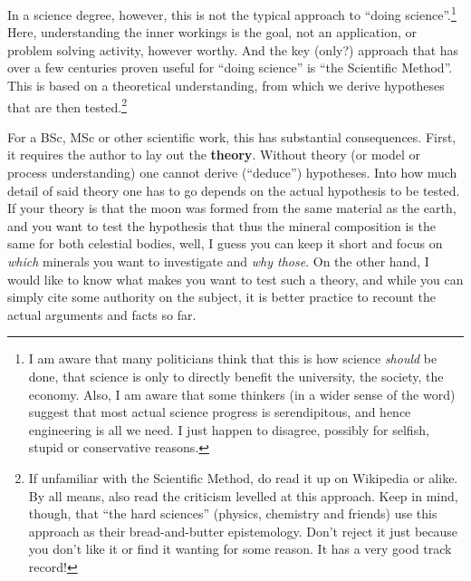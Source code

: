 In a science degree, however, this is not the typical approach to ``doing science''.\footnote{I am aware that many politicians think that this is how science \emph{should} be done, that science is only to directly benefit the university, the society, the economy. Also, I am aware that some thinkers (in a wider sense of the word) suggest that most actual science progress is serendipitous, and hence engineering is all we need. I just happen to disagree, possibly for selfish, stupid or conservative reasons.} 
Here, understanding the inner workings is the goal, not an application, or problem solving activity, however worthy. And the key (only?) approach that has over a few centuries proven useful for ``doing science'' is ``the Scientific Method''. This is based on a theoretical understanding, from which we derive hypotheses that are then tested.\footnote{If unfamiliar with the Scientific Method, do read it up on Wikipedia or alike. By all means, also read the criticism levelled at this approach. Keep in mind, though, that ``the hard sciences'' (physics, chemistry and friends) use this approach as their bread-and-butter epistemology. Don't reject it just because you don't like it or find it wanting for some reason. It has a very good track record!}

For a BSc, MSc or other scientific work, this has substantial consequences. First, it requires the author to lay out the \textbf{theory}. Without theory (or model or process understanding) one cannot derive (``deduce'') hypotheses. Into how much detail of said theory one has to go depends on the actual hypothesis to be tested. If your theory is that the moon was formed from the same material as the earth, and you want to test the hypothesis that thus the mineral composition is the same for both celestial bodies, well, I guess you can keep it short and focus on \emph{which} minerals you want to investigate and \emph{why those}. On the other hand, I would like to know what makes you want to test such a theory, and while you can simply cite some authority on the subject, it is better practice to recount the actual arguments and facts so far.

